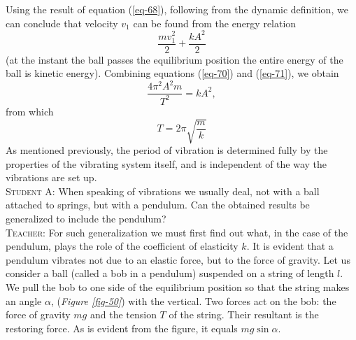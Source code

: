 \documentclass[a4paper,sfsidenotes]{tufte-book}
\begin{document}
Using the result of equation (\ref{eq-68}), following from the dynamic definition, we can conclude that velocity $v_{1}$ can be found from the energy relation \\
\begin{equation}
\frac{m v_{1}^{2}}{2} + \frac{k A^{2}}{2}
\label{eq-71}
\end{equation}
(at the instant the ball passes the equilibrium position the entire energy of the ball is kinetic energy). Combining equations (\ref{eq-70}) and (\ref{eq-71}), we obtain 
\\
\begin{equation*}
\frac{4 \pi^{2} A^{2} m}{T^{2}}=kA^{2}, 
\end{equation*}
from which\\
\begin{equation}
T=2 \pi \sqrt{\frac{m}{k}}
\label{eq-72}
\end{equation}
As mentioned previously, the period of vibration is determined fully by the properties of the vibrating system itself, and is independent of the way the vibrations are set up.
\\
\textsc{Student A:} When speaking of vibrations we usually deal, not with a ball attached to springs,
but with a pendulum. Can the obtained results be generalized to include the pendulum?
\\
\textsc{Teacher:} For such generalization we must first find out what, in the case of the pendulum, plays the role of the coefficient of elasticity $k$. It is evident that a pendulum vibrates not due to an elastic force, but to the force of gravity. Let us consider a ball (called a bob in a pendulum) suspended on a string of length $l$. We pull the bob to one side of the equilibrium position so that the string makes an angle $\alpha$, (\emph{Figure \ref{fig-50}}) with the vertical. Two forces act on the bob: the force of gravity $mg$ and the tension $T$ of the string. Their resultant is the restoring force. As is evident from the figure, it equals $mg \sin \alpha$.\\
\end{document}
